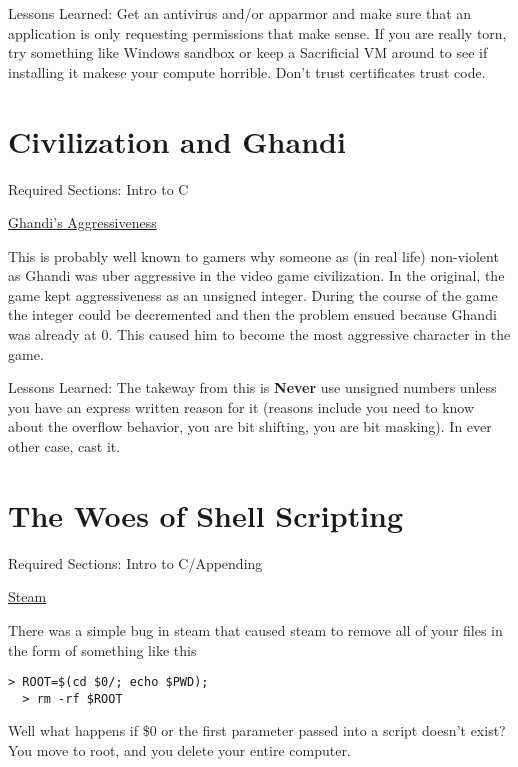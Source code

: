 Lessons Learned: Get an antivirus and/or apparmor and make sure that an application is only requesting permissions that make sense. If you are really torn, try something like Windows sandbox or keep a Sacrificial VM around to see if installing it makese your compute horrible. Don't trust certificates trust code.

\section{Civilization and Ghandi}

Required Sections: Intro to C

\href{https://www.geek.com/games/why-gandhi-is-always-a-warmongering-jerk-in-civilization-1608515/}{Ghandi's Aggressiveness}

This is probably well known to gamers why someone as (in real life) non-violent as Ghandi was uber aggressive in the video game civilization. In the original, the game kept aggressiveness as an unsigned integer. During the course of the game the integer could be decremented and then the problem ensued because Ghandi was already at 0. This caused him to become the most aggressive character in the game.

Lessons Learned: The takeway from this is \textbf{Never} use unsigned numbers unless you have an express written reason for it (reasons include you need to know about the overflow behavior, you are bit shifting, you are bit masking). In ever other case, cast it.


\section{The Woes of Shell Scripting}

Required Sections: Intro to C/Appending

\href{https://www.pcworld.com/article/2871653/scary-steam-for-linux-bug-erases-all-the-personal-files-on-your-pc.html}{Steam}

There was a simple bug in steam that caused steam to remove all of your files in the form of something like this

\begin{lstlisting}[language=console]
  > ROOT=$(cd $0/; echo $PWD);
  > rm -rf $ROOT
\end{lstlisting}

Well what happens if \$0 or the first parameter passed into a script doesn't exist? You move to root, and you delete your entire computer.

